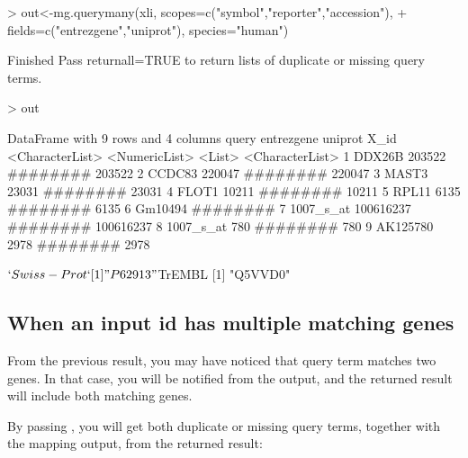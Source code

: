 \documentclass[12pt]{article}
\begin{document}
\begin{Schunk}
\begin{Sinput}
> out<-mg.querymany(xli, scopes=c("symbol","reporter","accession"), 
+              fields=c("entrezgene","uniprot"), species="human")
\end{Sinput}
\begin{Soutput}
Finished
Pass returnall=TRUE to return lists of duplicate or missing query terms.
\end{Soutput}
\begin{Sinput}
> out
\end{Sinput}
\begin{Soutput}
DataFrame with 9 rows and 4 columns
            query    entrezgene  uniprot            X_id
  <CharacterList> <NumericList>   <List> <CharacterList>
1          DDX26B        203522 ########          203522
2          CCDC83        220047 ########          220047
3           MAST3         23031 ########           23031
4           FLOT1         10211 ########           10211
5           RPL11          6135 ########            6135
6         Gm10494               ########                
7       1007_s_at     100616237 ########       100616237
8       1007_s_at           780 ########             780
9        AK125780          2978 ########            2978
\end{Soutput}
\begin{Soutput}
$`Swiss-Prot`
[1] "P62913"

$TrEMBL
[1] "Q5VVD0"
\end{Soutput}
\end{Schunk}



\subsection{When an input id has multiple matching genes}

From the previous result, you may have noticed that query term  matches two genes. In that case, you will be notified from the output, and the returned result will include both matching genes.

By passing , you will get both duplicate or missing query terms, together with the mapping output, from the returned result:
\end{document}
